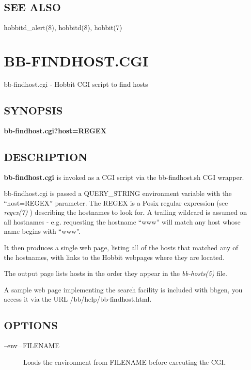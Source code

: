 \subsection{SEE ALSO}
hobbitd\_alert(8), hobbitd(8), hobbit(7) 

 
%
\newpage
\section{BB-FINDHOST.CGI}

 bb-findhost.cgi - Hobbit CGI script to find hosts

\subsection{SYNOPSIS}
\textbf{bb-findhost.cgi?host=REGEX}


 
\subsection{DESCRIPTION}
\textbf{bb-findhost.cgi}
 is invoked as a CGI script via the bb-findhost.sh CGI wrapper. 

  bb-findhost.cgi is passed a QUERY\_STRING environment variable with
  the ``host=REGEX'' parameter. The REGEX is a Posix regular
  expression (see \emph{regex(7)} ) describing the hostnames to look
  for. A trailing wildcard is assumed on all hostnames -
  e.g. requesting the hostname ``www'' will match any host whose name
  begins with ``www''. 

  It then produces a single web page, listing all of the hosts that
  matched any of the hostnames, with links to the Hobbit webpages
  where they are located. 

  The output page lists hosts in the order they appear in the
  \emph{bb-hosts(5)} file. 



  A sample web page implementing the search facility is included with
  bbgen, you access it via the URL /bb/help/bb-findhost.html. 



 
\subsection{OPTIONS}
\begin{description}
\item[--env=FILENAME] Loads the environment from FILENAME before executing the CGI. 

 


\end{description}
